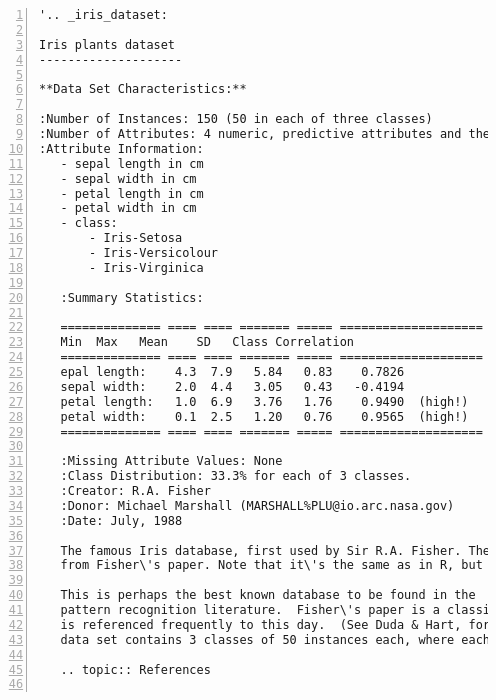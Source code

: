\begin{code}
\begin{lstlisting}[language=MyPython, numbers=left]
'.. _iris_dataset:
    
Iris plants dataset
--------------------
    
**Data Set Characteristics:**
    
:Number of Instances: 150 (50 in each of three classes)
:Number of Attributes: 4 numeric, predictive attributes and the class
:Attribute Information:
   - sepal length in cm
   - sepal width in cm
   - petal length in cm
   - petal width in cm
   - class:
       - Iris-Setosa
       - Iris-Versicolour
       - Iris-Virginica
      
   :Summary Statistics:
   
   ============== ==== ==== ======= ===== ====================
   Min  Max   Mean    SD   Class Correlation
   ============== ==== ==== ======= ===== ====================
   epal length:    4.3  7.9   5.84   0.83    0.7826
   sepal width:    2.0  4.4   3.05   0.43   -0.4194
   petal length:   1.0  6.9   3.76   1.76    0.9490  (high!)
   petal width:    0.1  2.5   1.20   0.76    0.9565  (high!)
   ============== ==== ==== ======= ===== ====================
   
   :Missing Attribute Values: None
   :Class Distribution: 33.3% for each of 3 classes.
   :Creator: R.A. Fisher
   :Donor: Michael Marshall (MARSHALL%PLU@io.arc.nasa.gov)
   :Date: July, 1988
   
   The famous Iris database, first used by Sir R.A. Fisher. The dataset is taken
   from Fisher\'s paper. Note that it\'s the same as in R, but not as in the UCI\nMachine Learning Repository, which has two wrong data points.
   
   This is perhaps the best known database to be found in the
   pattern recognition literature.  Fisher\'s paper is a classic in the field and
   is referenced frequently to this day.  (See Duda & Hart, for example.)  The
   data set contains 3 classes of 50 instances each, where each class refers to a\ntype of iris plant.  One class is linearly separable from the other 2; the\nlatter are NOT linearly separable from each other.
   
   .. topic:: References
   

\end{lstlisting}
\end{code}
